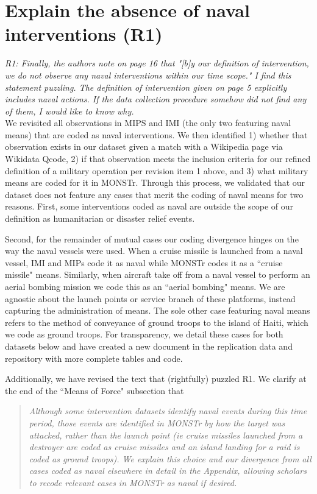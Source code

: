 \documentclass[fleqn,12pt]{article}
\begin{document}
\section{Explain the absence of naval interventions (R1)}
\textit{R1: Finally, the authors note on page 16 that "[b]y our definition of intervention, we do not observe any naval interventions within our time scope." I find this statement puzzling. The definition of intervention given on page 5 explicitly includes naval actions. If the data collection procedure somehow did not find any of them, I would like to know why.} \\

We revisited all observations in MIPS and IMI (the only two featuring naval means) that are coded as naval interventions. We then identified 1) whether that observation exists in our dataset given a match with a Wikipedia page via Wikidata Qcode, 2) if that observation meets the inclusion criteria for our refined definition of a military operation per revision item 1 above, and 3) what military means are coded for it in MONSTr. Through this process, we validated that our dataset does not feature any cases that merit the coding of naval means for two reasons. First, some interventions coded as naval are outside the scope of our definition as humanitarian or disaster relief events.

Second, for the remainder of mutual cases our coding divergence hinges on the way the naval vessels were used. When a cruise missile is launched from a naval vessel, IMI and MIPs code it as naval while MONSTr codes it as a ``cruise missile" means. Similarly, when aircraft take off from a naval vessel to perform an aerial bombing mission we code this as an ``aerial bombing" means. We are agnostic about the launch points or service branch of these platforms, instead capturing the administration of means. The sole other case featuring naval means refers to the method of conveyance of ground troops to the island of Haiti, which we code as ground troops. For transparency, we detail these cases for both datasets below and have created a new document in the replication data and repository with more complete tables and code.

Additionally, we have revised the text that (rightfully) puzzled R1. We clarify at the end of the ``Means of Force" subsection that 

\begin{quote}
    \textit{Although some intervention datasets identify naval events during this time period, those events are identified in MONSTr by how the target was attacked, rather than the launch point (ie cruise missiles launched from a destroyer are coded as cruise missiles and an island landing for a raid is coded as ground troops). We explain this choice and our divergence from all cases coded as naval elsewhere in detail in the Appendix, allowing scholars to recode relevant cases in MONSTr as naval if desired.}
\end{quote}
\end{document}
